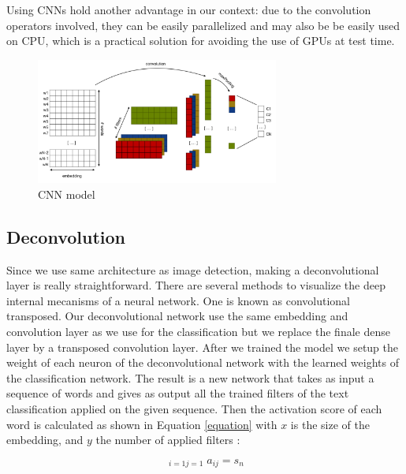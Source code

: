 Using CNNs hold another advantage in our context: due to the convolution operators involved, they can be easily parallelized and may also be be easily used on CPU, 
which is a practical solution for avoiding the use of GPUs at test time. 


\begin{figure}[h]
\begin{center}
\includegraphics[width=8cm]{img/model_classif2.png}
\caption{CNN model}
\label{cnn}
\end{center}
\end{figure}

\subsection{Deconvolution}

Since we use same architecture as image detection, making a deconvolutional layer is really straightforward. There are several methods to visualize the deep internal mecanisms of a neural network. One is known as convolutional transposed. Our deconvolutional network use the same embedding and convolution layer as we use for the classification but we replace the finale dense layer by a transposed convolution layer. After we trained the model we setup the weight of each neuron of the deconvolutional network with the learned weights of the classification network. The result is a new network that takes as input a sequence of words and gives as output all the trained filters of the text classification applied on the given sequence. Then the activation score of each word is calculated as shown in Equation \ref{equation} with $x$ is the size of the embedding, and $y$ the number of applied filters : 

\begin{equation}
\mathop{\sum^{x}\sum^{y}}_{i=1  j=1}  a_{ij} = s_{n}
\label{equation}
\end{equation}

